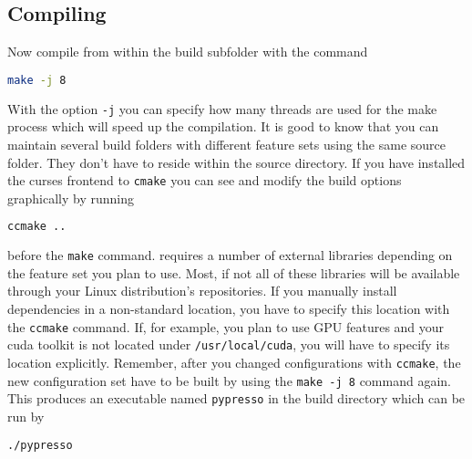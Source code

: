 \documentclass[
paper=a4,                       %
fontsize=11pt,                  %
headinclude=false,              %
footinclude=false,              %
pagesize,                       %
]{scrartcl}
\begin{document}

\subsection{Compiling \es{}}
Now compile \es from within the build subfolder with the command
%
\begin{lstlisting}[language=bash]
make -j 8
\end{lstlisting}
With the option \verb!-j! you can specify how many threads are used for the make process which will speed up the compilation.
%
It is good to know that you can maintain several build folders with different feature sets using the same \es{} source folder. They don't have to reside within the source directory.
%
If you have installed the curses frontend to \verb!cmake! you can see and modify the build options graphically by running
\begin{lstlisting}[language=bash]
ccmake ..
\end{lstlisting}
before the \verb!make! command. \es{} requires a number of external libraries depending on the feature set you plan to use. Most, if not all of these libraries will be available through your Linux distribution's repositories. If you manually install dependencies in a non-standard location, you have to specify this location with the \texttt{ccmake} command. If, for example, you plan to use GPU features and your cuda toolkit is not located under \texttt{/usr/local/cuda}, you will have to specify its location explicitly. Remember, after you changed configurations with \verb!ccmake!, the new configuration set have to be built by using the \verb!make -j 8! command again.
%
This produces an executable named \verb!pypresso! in the build directory which can be run by
\begin{lstlisting}[language=bash]
./pypresso
\end{lstlisting}
\end{document}
